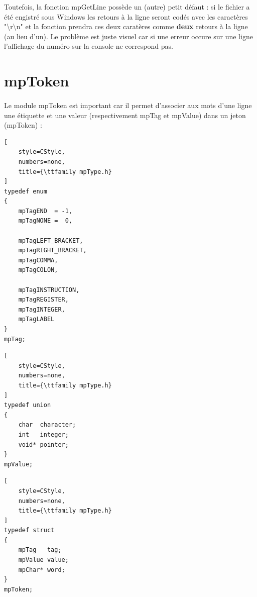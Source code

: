 \documentclass[12pt]{report} %
\begin{document}
Toutefois, la fonction {\ttfamily mpGetLine} possède un (autre) petit défaut : si le fichier a été engistré sous Windows les retours à la ligne seront codés avec les caractères "{\ttfamily \textbackslash r\textbackslash n}" et la fonction prendra ces deux caratères comme \textbf{deux} retours à la ligne (au lieu d'un). Le problème est juste visuel car si une erreur occure sur une ligne l'affichage du numéro sur la console ne correspond pas.



\section{mpToken}
\label{section_mpToken}

\paragraph{}
Le module {\ttfamily mpToken} est important car il permet d'associer aux mots d'une ligne une étiquette et une valeur (respectivement {\ttfamily mpTag} et {\ttfamily mpValue}) dans un jeton ({\ttfamily mpToken}) :

\noindent
\begin{minipage}[t]{.3\textwidth}
\begin{lstlisting}[
    style=CStyle,
    numbers=none,
    title={\ttfamily mpType.h}
]
typedef enum
{
    mpTagEND  = -1,
    mpTagNONE =  0,

    mpTagLEFT_BRACKET,
    mpTagRIGHT_BRACKET,
    mpTagCOMMA,
    mpTagCOLON,

    mpTagINSTRUCTION,
    mpTagREGISTER,
    mpTagINTEGER,
    mpTagLABEL
}
mpTag;
\end{lstlisting}
\end{minipage}\hfill
%
\begin{minipage}[t]{.3\textwidth}
\begin{lstlisting}[
    style=CStyle,
    numbers=none,
    title={\ttfamily mpType.h}
]
typedef union
{
    char  character;
    int   integer;
    void* pointer;
}
mpValue;
\end{lstlisting}
\end{minipage}\hfill
%
\begin{minipage}[t]{.3\textwidth}
\begin{lstlisting}[
    style=CStyle,
    numbers=none,
    title={\ttfamily mpType.h}
]
typedef struct
{
    mpTag   tag;
    mpValue value;
    mpChar* word;
}
mpToken;
\end{lstlisting}
\end{minipage}
\end{document}
